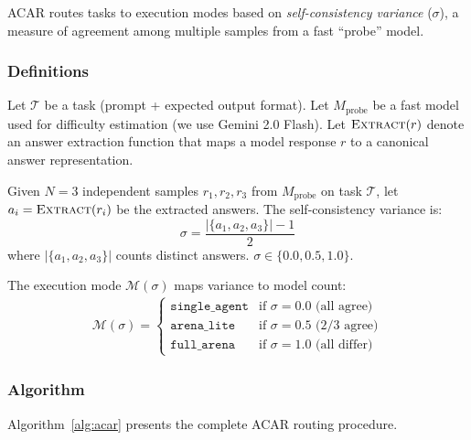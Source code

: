 \documentclass{article}
\newcommand{\acar}{\textsc{ACAR}}
\begin{document}
\acar{} routes tasks to execution modes based on \emph{self-consistency variance} ($\sigma$), a measure of agreement among multiple samples from a fast ``probe'' model.

\subsubsection{Definitions}

Let $\mathcal{T}$ be a task (prompt + expected output format). Let $M_{\text{probe}}$ be a fast model used for difficulty estimation (we use Gemini 2.0 Flash). Let $\textsc{Extract}(r)$ denote an answer extraction function that maps a model response $r$ to a canonical answer representation.

\begin{definition}
Given $N=3$ independent samples $r_1, r_2, r_3$ from $M_{\text{probe}}$ on task $\mathcal{T}$, let $a_i = \textsc{Extract}(r_i)$ be the extracted answers. The self-consistency variance is:
\begin{equation}
\sigma = \frac{|\{a_1, a_2, a_3\}| - 1}{2}
\end{equation}
where $|\{a_1, a_2, a_3\}|$ counts distinct answers. $\sigma \in \{0.0, 0.5, 1.0\}$.
\end{definition}

\begin{definition}
The execution mode $\mathcal{M}(\sigma)$ maps variance to model count:
\begin{align}
\mathcal{M}(\sigma) = \begin{cases}
\texttt{single\_agent} & \text{if } \sigma = 0.0 \text{ (all agree)} \\
\texttt{arena\_lite} & \text{if } \sigma = 0.5 \text{ (2/3 agree)} \\
\texttt{full\_arena} & \text{if } \sigma = 1.0 \text{ (all differ)}
\end{cases}
\end{align}
\end{definition}

\subsubsection{Algorithm}

Algorithm~\ref{alg:acar} presents the complete \acar{} routing procedure.
\end{document}
